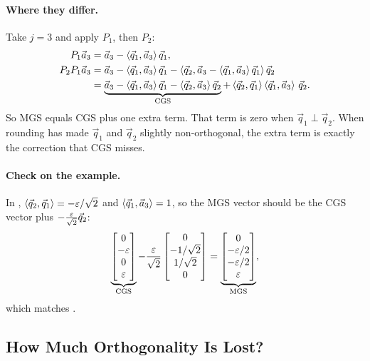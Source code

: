 \paragraph{Where they differ.} Take $j = 3$ and apply $P_1$, then $P_2$:
\begin{align}
  P_1\vec{a}_3 &= \vec{a}_3 - \left\langle \vec{q}_1, \vec{a}_3 \right\rangle\vec{q}_1, \\
  P_2P_1\vec{a}_3 &= \vec{a}_3 - \left\langle \vec{q}_1, \vec{a}_3 \right\rangle\vec{q}_1 - \left\langle \vec{q}_2, \vec{a}_3 - \left\langle \vec{q}_1, \vec{a}_3 \right\rangle\vec{q}_1 \right\rangle\vec{q}_2 \\
  &= \underbrace{\vec{a}_3 - \left\langle \vec{q}_1, \vec{a}_3 \right\rangle\vec{q}_1 - \left\langle \vec{q}_2, \vec{a}_3 \right\rangle\vec{q}_2}_{\text{CGS}} + \left\langle \vec{q}_2, \vec{q}_1 \right\rangle\left\langle \vec{q}_1, \vec{a}_3 \right\rangle\,\vec{q}_2.
\end{align}
So MGS equals CGS plus one extra term. That term is zero when $\vec{q}_1 \perp \vec{q}_2$. When rounding has made $\vec{q}_1$ and $\vec{q}_2$ slightly non-orthogonal, the extra term is exactly the correction that CGS misses.

\paragraph{Check on the example.} In , $\left\langle \vec{q}_2, \vec{q}_1 \right\rangle = -\varepsilon/\sqrt{2}$ and $\left\langle \vec{q}_1, \vec{a}_3 \right\rangle = 1$, so the MGS vector should be the CGS vector plus $-\frac{\varepsilon}{\sqrt{2}}\vec{q}_2$:
\begin{equation}
  \underbrace{\begin{bmatrix} 0 \\ -\varepsilon \\ 0 \\ \varepsilon \end{bmatrix}}_{\text{CGS}} - \frac{\varepsilon}{\sqrt{2}}\begin{bmatrix} 0 \\ -1/\sqrt{2} \\ 1/\sqrt{2} \\ 0 \end{bmatrix} = \underbrace{\begin{bmatrix} 0 \\ -\varepsilon/2 \\ -\varepsilon/2 \\ \varepsilon \end{bmatrix}}_{\text{MGS}},
\end{equation}
which matches .

\subsection{How Much Orthogonality Is Lost?}

